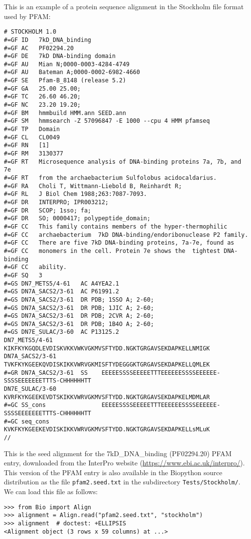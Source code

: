 This is an example of a protein sequence alignment in the Stockholm file format used by PFAM:

\begin{verbatim}
# STOCKHOLM 1.0
#=GF ID   7kD_DNA_binding
#=GF AC   PF02294.20
#=GF DE   7kD DNA-binding domain
#=GF AU   Mian N;0000-0003-4284-4749
#=GF AU   Bateman A;0000-0002-6982-4660
#=GF SE   Pfam-B_8148 (release 5.2)
#=GF GA   25.00 25.00;
#=GF TC   26.60 46.20;
#=GF NC   23.20 19.20;
#=GF BM   hmmbuild HMM.ann SEED.ann
#=GF SM   hmmsearch -Z 57096847 -E 1000 --cpu 4 HMM pfamseq
#=GF TP   Domain
#=GF CL   CL0049
#=GF RN   [1]
#=GF RM   3130377
#=GF RT   Microsequence analysis of DNA-binding proteins 7a, 7b, and 7e
#=GF RT   from the archaebacterium Sulfolobus acidocaldarius. 
#=GF RA   Choli T, Wittmann-Liebold B, Reinhardt R; 
#=GF RL   J Biol Chem 1988;263:7087-7093.
#=GF DR   INTERPRO; IPR003212;
#=GF DR   SCOP; 1sso; fa;
#=GF DR   SO; 0000417; polypeptide_domain;
#=GF CC   This family contains members of the hyper-thermophilic
#=GF CC   archaebacterium  7kD DNA-binding/endoribonuclease P2 family.
#=GF CC   There are five 7kD DNA-binding proteins, 7a-7e, found as
#=GF CC   monomers in the cell. Protein 7e shows the  tightest DNA-binding
#=GF CC   ability.
#=GF SQ   3
#=GS DN7_METS5/4-61   AC A4YEA2.1
#=GS DN7A_SACS2/3-61  AC P61991.2
#=GS DN7A_SACS2/3-61  DR PDB; 1SSO A; 2-60;
#=GS DN7A_SACS2/3-61  DR PDB; 1JIC A; 2-60;
#=GS DN7A_SACS2/3-61  DR PDB; 2CVR A; 2-60;
#=GS DN7A_SACS2/3-61  DR PDB; 1B4O A; 2-60;
#=GS DN7E_SULAC/3-60  AC P13125.2
DN7_METS5/4-61              KIKFKYKGQDLEVDISKVKKVWKVGKMVSFTYDD.NGKTGRGAVSEKDAPKELLNMIGK
DN7A_SACS2/3-61             TVKFKYKGEEKQVDISKIKKVWRVGKMISFTYDEGGGKTGRGAVSEKDAPKELLQMLEK
#=GR DN7A_SACS2/3-61  SS    EEEEESSSSEEEEETTTEEEEEESSSSEEEEEE-SSSSEEEEEEETTTS-CHHHHHHTT
DN7E_SULAC/3-60             KVRFKYKGEEKEVDTSKIKKVWRVGKMVSFTYDD.NGKTGRGAVSEKDAPKELMDMLAR
#=GC SS_cons                EEEEESSSSEEEEETTTEEEEEESSSSEEEEEE-SSSSEEEEEEETTTS-CHHHHHHTT
#=GC seq_cons               KVKFKYKGEEKEVDISKIKKVWRVGKMVSFTYDD.NGKTGRGAVSEKDAPKELLsMLuK
//
\end{verbatim}
This is the seed alignment for the 7kD\_DNA\_binding (PF02294.20) PFAM entry, downloaded from the InterPro website (\url{https://www.ebi.ac.uk/interpro/}). This version of the PFAM entry is also available in the Biopython source distribution as the file \verb+pfam2.seed.txt+ in the subdirectory \verb+Tests/Stockholm/+. We can load this file as follows:
\begin{verbatim}
>>> from Bio import Align
>>> alignment = Align.read("pfam2.seed.txt", "stockholm")
>>> alignment  # doctest: +ELLIPSIS
<Alignment object (3 rows x 59 columns) at ...>
\end{verbatim}

